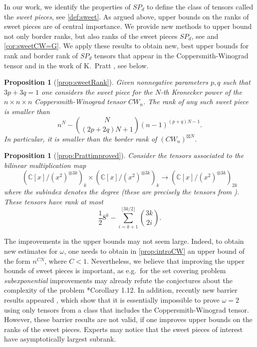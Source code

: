 \documentclass[a4paper,11pt,reqno]{amsart}
\numberwithin{equation}{section}
\theoremstyle{definition}
\theoremstyle{plain}
\newtheorem{prop}[defn]{Proposition}
\theoremstyle{remark}
\def\CC{\mathbb{C}}
\begin{document}
In our work, we identify the properties of $SP_d$ to define the class of tensors called the \emph{sweet pieces}, see \autoref{def:sweet}. As argued above, {upper bounds on the ranks of sweet pieces are of central importance.} We provide new methods to upper bound not only border ranks, but also ranks of the sweet pieces $SP_d$, see  and \autoref{cor:sweetCW=G}.
We apply these results to obtain new, best upper bounds for rank and border
rank of $SP_d$ tensors that appear in the Coppersmith-Winograd tensor
and in the work of K.~Pratt \cite{pratt2023stronger}, see below.
\begin{prop}[\autoref{prop:sweetRank}]\label{prop:introCW}
{Given nonnegative parameters $p,q$ such that $3p+3q=1$ one considers the sweet piece for the $N$-th Kronecker power of the $n\times n\times n$  Coppersmith-Winograd tensor $CW_n$. The rank of any such sweet piece} is {smaller} than
    \[n^N-\binom{N}{(2p+2q)N+1}(n-1)^{(p+q)N-1}.\] In particular, it is
    {smaller} than the border rank of $(CW_n)^{\boxtimes N}$.
\end{prop}
\begin{prop}[\autoref{prop:Prattimproved}]
Consider the tensors associated to the bilinear multiplication map
\[({\CC[x]/(x^2)}^{\otimes 3k})_k\times ({\CC[x]/(x^2)}^{\otimes 3k})_k\rightarrow ({\CC[x]/(x^2)}^{\otimes 3k})_{2k}\]
where the subindex denotes the degree (these are precisely the tensors from
\cite{pratt2023stronger}).
These tensors have rank at most
\[\frac{1}{2}8^{k}-\sum_{i=k+1}^{\lfloor 3k/2\rfloor} \binom{3k}{2i}.\]
\end{prop}

The improvements in the upper bounds {may not seem large.} Indeed, to obtain new estimates {for} $\omega$, one needs to obtain in \autoref{prop:introCW} an upper bound of {the form} $n^{CN}$, where $C<1$. {Nevertheless}, we believe that improving the upper bounds of sweet pieces is important, as e.g.~for the set covering problem \emph{subexponential} improvements may already refute the conjectures about the complexity of the problem \cite{pratt2023stronger}*{Corollary 1.12}. {In addition,} recently new barrier results appeared \cites{CVZ21, blaser2020slice}, {which show that it is essentially impossible to prove $\omega=2$ using only tensors from a class that includes} the Coppersmith-Winograd tensor. However, these barrier results are not valid, if one improves upper bounds on {the} ranks of the sweet pieces. Experts may notice that the sweet pieces of interest have asymptotically largest subrank.
\end{document}
